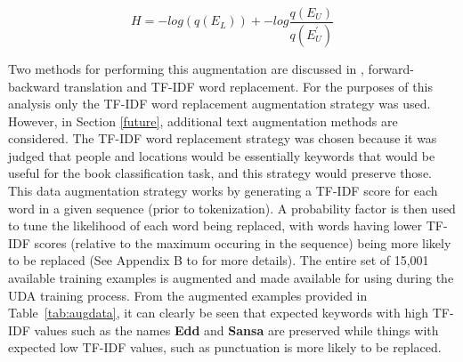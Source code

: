 \documentclass[twoside,twocolumn,10pt]{article}
\begin{document}
 \begin{equation}
 \label{eq:loss}
 H = -log(q(E_{L})) + -log\frac{q(E_{U})}{q(E^{\prime}_{U})}
 \end{equation}

Two methods for performing this augmentation are discussed in \cite{Xie:2019}, forward-backward translation and TF-IDF word replacement. For the purposes of this analysis only the TF-IDF word replacement augmentation strategy was used. However, in Section \ref{future}, additional text augmentation methods are considered. The TF-IDF word replacement strategy was chosen because it was judged that people and locations would be essentially keywords that would be useful for the book classification task, and this strategy would preserve those. This data augmentation strategy works by generating a TF-IDF score for each word in a given sequence (prior to tokenization). A probability factor is then used to tune the likelihood of each word being replaced, with words having lower TF-IDF scores (relative to the maximum occuring in the sequence) being more likely to be replaced (See Appendix B to \cite{Xie:2019} for more details).  The entire set of  15,001 available training examples is augmented and made available for using during the UDA training process. From the augmented examples provided in Table~\ref{tab:augdata}, it can clearly be seen that expected keywords with high TF-IDF values such as the names \textbf{Edd} and \textbf{Sansa} are preserved while things with expected low TF-IDF values, such as punctuation is more likely to be replaced.  
\end{document}
